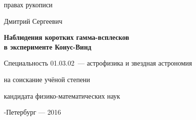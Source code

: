 \fontsize{14pt}{15pt}\selectfont  %
\thispagestyle{empty}

\vspace{10mm}
\begin{flushright}
   правах рукописи
  \textit{}
\end{flushright}

\vspace{30mm}
\begin{center}
{\Large{} Дмитрий Сергеевич}
\end{center}

\vspace{30mm}
\begin{center}
{\bf \LARGE Наблюдения коротких гамма-всплесков \\в эксперименте Конус-Винд
\par}

\vspace{30mm}
{\Large
Специальность 01.03.02~--- астрофизика и звездная астрономия
}

\vspace{15mm}
\par
{} на соискание учёной степени\par
кандидата физико-математических наук
\end{center}

\vspace{40mm}
\begin{center}
{-Петербург --- 2016}
\end{center}

\newpage

